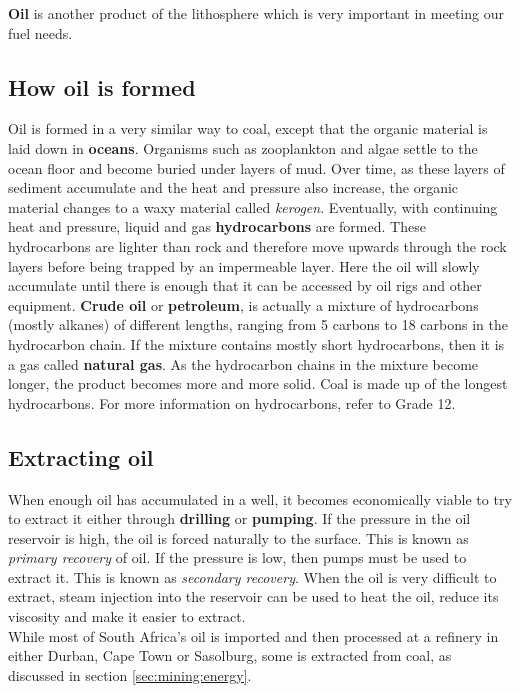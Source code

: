 \textbf{Oil} is another product of the lithosphere which is very important in meeting our fuel needs. 

\subsection{How oil is formed}

Oil is formed in a very similar way to coal, except that the organic material is laid down in \textbf{oceans}. Organisms such as zooplankton and algae settle to the ocean floor and become buried under layers of mud. Over time, as these layers of sediment accumulate and the heat and pressure also increase, the organic material changes to a waxy material called \textit{kerogen}. Eventually, with continuing heat and pressure, liquid and gas \textbf{hydrocarbons} are formed. These hydrocarbons are lighter than rock and therefore move upwards through the rock layers before being trapped by an impermeable layer. Here the oil will slowly accumulate until there is enough that it can be accessed by oil rigs and other equipment. \textbf{Crude oil} or \textbf{petroleum}, is actually a mixture of hydrocarbons (mostly alkanes) of different lengths, ranging from 5 carbons to 18 carbons in the hydrocarbon chain. If the mixture contains mostly short hydrocarbons, then it is a gas called \textbf{natural gas}. As the hydrocarbon chains in the mixture become longer, the product becomes more and more solid. Coal is made up of the longest hydrocarbons. For more information on hydrocarbons, refer to Grade 12.

\subsection{Extracting oil}

When enough oil has accumulated in a well, it becomes economically viable to try to extract it either through \textbf{drilling} or \textbf{pumping}. If the pressure in the oil reservoir is high, the oil is forced naturally to the surface. This is known as \textit{primary recovery} of oil. If the pressure is low, then pumps must be used to extract it. This is known as \textit{secondary recovery}. When the oil is very difficult to extract, steam injection into the reservoir can be used to heat the oil, reduce its viscosity and make it easier to extract.\\

While most of South Africa's oil is imported and then processed at a refinery in either Durban, Cape Town or Sasolburg, some is extracted from coal, as discussed in section \ref{sec:mining:energy}.



